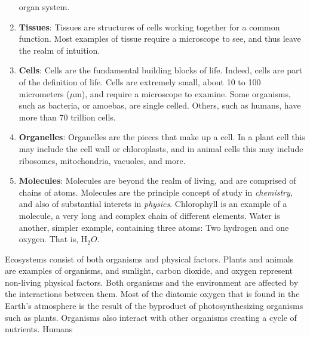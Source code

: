 \documentclass[crop=false,class=book,oneside]{standalone}
\begin{document}
\begin{enumerate}
                  organ system.
            \item \textbf{Tissues}: Tissues are structures
                  of cells working together for a common
                  function. Most examples of tissue require
                  a microscope to see, and thus leave
                  the realm of intuition.
            \item \textbf{Cells}: Cells are the
                  fundamental building blocks of life.
                  Indeed, cells are part of the
                  definition of life. Cells are extremely
                  small, about 10 to 100 micrometers
                  ($\mu\textrm{m}$), and require a
                  microscope to examine. Some organisms,
                  such as bacteria, or amoebas, are
                  single celled. Others, such as humans,
                  have more than 70 trillion cells.
            \item \textbf{Organelles}: Organelles are the
                  pieces that make up a cell. In a plant
                  cell this may include the cell wall or
                  chloroplasts, and in animal cells this
                  may include ribosomes, mitochondria,
                  vacuoles, and more.
            \item \textbf{Molecules}: Molecules are
                  beyond the realm of \textrm{living},
                  and are comprised of chains of atoms.
                  Molecules are the principle concept of
                  study in \textit{chemistry}, and also
                  of substantial interets in
                  \textit{physics}. Chlorophyll is an
                  example of a molecule, a very long and
                  complex chain of different elements.
                  Water is another, simpler example,
                  containing three atoms: Two hydrogen and
                  one oxygen. That is,
                  $\textrm{H}_{2}O$.
        \end{enumerate}
        Ecosystems consist of both organisms and
        physical factors. Plants and animals
        are examples of organisms, and sunlight,
        carbon dioxide, and oxygen represent
        non-living physical factors. Both organisms and
        the environment are affected by the interactions
        between them. Most of the diatomic oxygen that is
        found in the Earth's atmosphere is the result of
        the byproduct of photosynthesizing organisms such
        as plants. Organisms also interact with other
        organisms creating a cycle of nutrients. Humans
\end{document}
